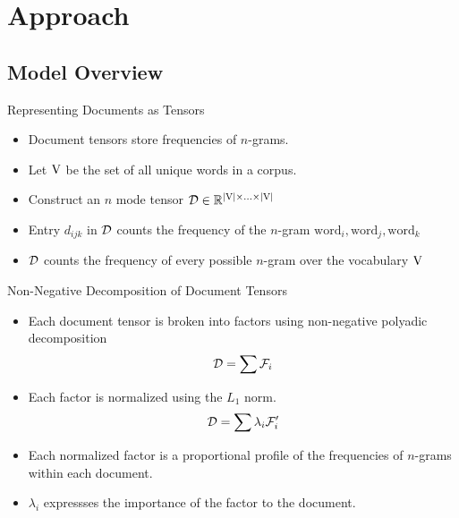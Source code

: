 \documentclass[handout]{beamer}
\begin{document}
\section{Approach}
\subsection{Model Overview}
\begin{frame}{Representing Documents as Tensors}
  \begin{itemize}[<+->]
  \item Document tensors store frequencies of $n$-grams.
  \item Let $\mathrm{V}$ be the set of all unique words in a corpus.
  \item Construct an $n$ mode tensor $\mathcal{D} \in \mathbb{R}^{|\mathrm{V}|
      \times \ldots \times |\mathrm{V}|}$
  \item Entry $d_{ijk}$ in $\mathcal{D}$ counts the frequency of the $n$-gram
    $\mathrm{word}_i, \mathrm{word}_j, \mathrm{word}_k$
  \item $\mathcal{D}$ counts the frequency of every possible $n$-gram
    over the vocabulary $\mathrm{V}$
  \end{itemize}
\end{frame}



\begin{frame}{Non-Negative Decomposition of Document Tensors}
  \begin{itemize}[<+->]
    \item Each document tensor is broken into factors using non-negative polyadic
      decomposition
      \[
          \mathcal{D} = \sum \mathcal{F}_i 
        \]
      \item Each factor is normalized using the $L_1$ norm.
        \[
          \mathcal{D} = \sum \lambda_i \mathcal{F}'_i
        \]
      \item Each normalized factor is a proportional profile of the
        frequencies of $n$-grams within each document.
      \item $\lambda_i$ expressses the importance of the factor to the
        document.
  \end{itemize}
\end{frame}
\end{document}
